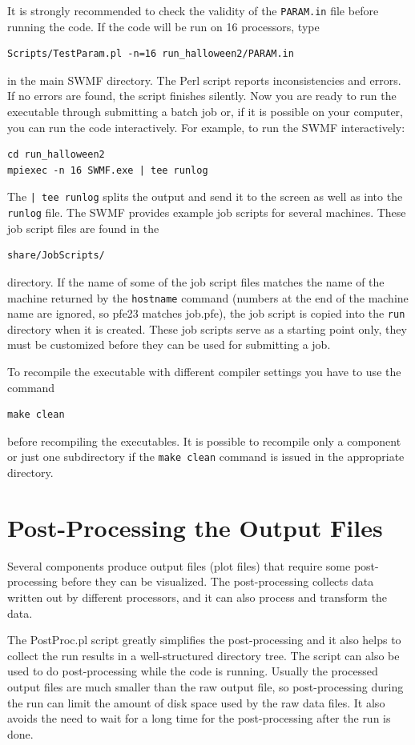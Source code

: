 It is strongly recommended to check the validity of the {\tt PARAM.in} 
file before running the code. If the code will be run on 16 processors, type
\begin{verbatim}
Scripts/TestParam.pl -n=16 run_halloween2/PARAM.in
\end{verbatim}
in the main SWMF directory.
The Perl script reports inconsistencies and errors. 
If no errors are found, the script finishes silently.
Now you are ready to run the executable through submitting a batch job or, 
if it is possible on your computer, you can run the code interactively.  For
example, to run the SWMF interactively:
\begin{verbatim}
cd run_halloween2
mpiexec -n 16 SWMF.exe | tee runlog
\end{verbatim}
The {\tt | tee runlog} splits the output and send it to the screen
as well as into the {\tt runlog} file.
The SWMF provides example job scripts for several machines. 
These job script files are found in the
\begin{verbatim}
share/JobScripts/
\end{verbatim}
directory. If the name of some of the job script files matches the
name of the machine returned by the {\tt hostname} command (numbers
at the end of the machine name are ignored, so pfe23 matches job.pfe), 
the job script is copied into the {\tt run} directory when it is created.
These job scripts serve as a starting point only, they must
be customized before they can be used for submitting a job.

To recompile the executable with different compiler settings you have
to use the command
\begin{verbatim}
make clean
\end{verbatim}
before recompiling the executables. It is possible to recompile
only a component or just one subdirectory if the {\tt make clean}
command is issued in the appropriate directory.

\section{Post-Processing the Output Files}

Several components produce output files (plot files) that require
some post-processing before they can be visualized. The post-processing
collects data written out by different processors, and it can also
process and transform the data. 

The PostProc.pl script greatly simplifies the post-processing and
it also helps to collect the run results in a well-structured directory tree.
The script can also be used to do post-processing while the code is running.
Usually the processed output files are much smaller than the raw output file,
so post-processing during the run can limit the amount of disk space used
by the raw data files. It also avoids the need to wait for a long time 
for the post-processing after the run is done. 

